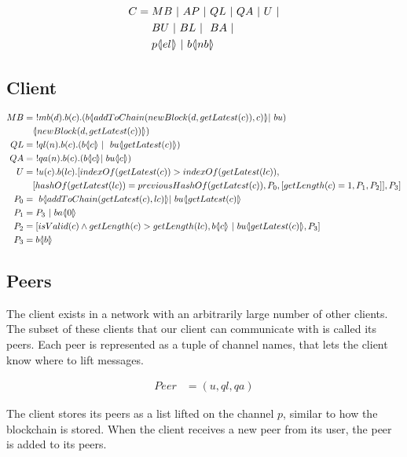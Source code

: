 \begin{align*}
    C &= MB\ |\ AP\ |\ QL\ |\ QA\ |\ U\ |\\
    &\quad \ BU\ |\ BL\ |\ \ BA\ |\\
    &\quad \ p \langle \! | el | \! \rangle\ |\ b \langle \! | nb | \! \rangle
\end{align*}

\subsection{Client}

\begin{align*}
    MB &=\ !mb(d).b(c).(b \lift{}{addToChain(newBlock(d,getLatest(c)),c)}| \ bu)\\
    &\quad \lift{}{newBlock(d, getLatest(c))})\\
    QL &=\ !ql(n).b(c).(b \lift{}{c}\ |\ \ bu\lift{}{getLatest(c)})\\
    QA &=\ !qa(n).b(c).(b\lift{}{c}| \ bu\lift{}{c})\\
    U &=\ !u(c).b(lc).[indexOf( getLatest(c))>indexOf(getLatest(lc)),\\
    &\quad[hashOf(getLatest(lc))=previousHashOf(getLatest(c)),P_0, [getLength(c)=1,P_1,P_2]],P_3]\\
    P_0 &=\ b\lift{}{addToChain(getLatest(c),lc)}| \ bu\lift{}{getLatest(c)}\\
    P_1 &= P_3\ |\ ba \lift{}{0}\\
    P_2 &= [isValid(c) \land getLength(c) > getLength(lc), b\lift{}{c}\ |\ bu \lift{}{getLatest(c)},P_3]\\
    P_3 &= b\lift{}{b}
\end{align*}

\subsection{Peers}
The client exists in a network with an arbitrarily large number of other clients.
The subset of these clients that our client can communicate with is called its peers.
Each peer is represented as a tuple of channel names, that lets the client know where to lift messages.

\begin{align*}
    Peer &= (u, ql, qa)
\end{align*}

The client stores its peers as a list lifted on the channel $p$, similar to how the blockchain is stored.
When the client receives a new peer from its user, the peer is added to its peers.

